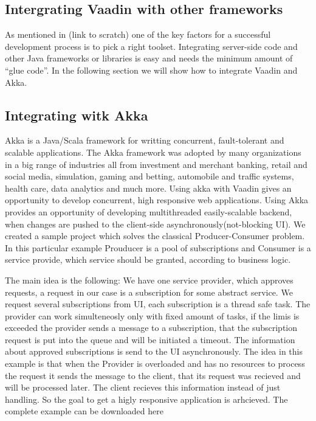 \documentclass{article}
\begin{document}
	\subsection {Intergrating Vaadin with other frameworks}
	  As mentioned in (link to scratch) one of the key factors for a successful
	  development process is to pick a right toolset. Integrating server-side
	  code and other Java frameworks or libraries is easy and needs the minimum
	  amount of ``glue code''. In the following section we will show how to
	  integrate Vaadin and Akka.
	   
	  \subsection {Integrating witk Akka}
	  Akka is a Java/Scala framework for writting concurrent, fault-tolerant and
	  scalable applications. The Akka framework was adopted by many organizations
	  in a big range of industries all from investment and merchant banking, retail and social media,
	   simulation, gaming and betting, automobile and traffic systems, health care,
	   data analytics and much more\cite {akkakUseCases}. Using akka with Vaadin
	   gives an opportunity to develop concurrent, high responsive web
	   applications. Using Akka provides an
	   opportunity of developing multithreaded easily-scalable backend, when
	   changes are pushed to the client-side asynchronously(not-blocking UI). 
	   We created a sample project which solves the classical Producer-Consumer
	   problem. In this particular example Prouducer is a pool of subscriptions and
	   Consumer is a service provide, which service should be granted, according to
	   business logic.
	   
	   The main idea is the following:
		 We have one service provider, which approves requests, a request in our case
		 is a subscription for some abstract service.
		 We request several subscriptions from UI, each subscription is a thread safe task. The provider can work simulteneosly
		 only with fixed amount of tasks, if the limis is exceeded the provider sends a message to a subscription,
		 that the subscription request is put into the queue and will be initiated a
		 timeout. The information about approved subscriptions is send to the UI
		 asynchronously. The idea in this example is that when the Provider is
		 overloaded and has no resources to process the request it sends the message
		 to the client, that its request was recieved and will be processed later. The
		 client recieves this information instead of just handling. So the goal to get
		 a higly responsive application is arhcieved. The complete example can be
		 downloaded here \cite{vaadinAkka}
	
\end{document}
